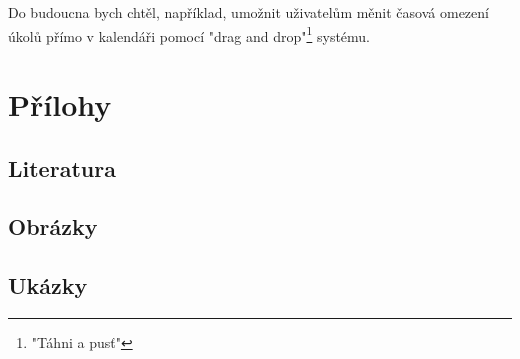 \documentclass[a4paper,12pt]{report}
\begin{document}
Do budoucna bych chtěl, například, umožnit uživatelům měnit časová omezení úkolů přímo v kalendáři pomocí "drag and drop"\footnote{"Táhni a pusť"} systému.
\chapter{Přílohy}


\let\clearpage\relax
\section{Literatura}
\printbibliography[heading=none]
\pagebreak
\section{Obrázky}
\vspace{-64pt}
\listoffigures
\pagebreak
\section{Ukázky}
\vspace{-48pt}
\lstlistoflistings
\end{document}
